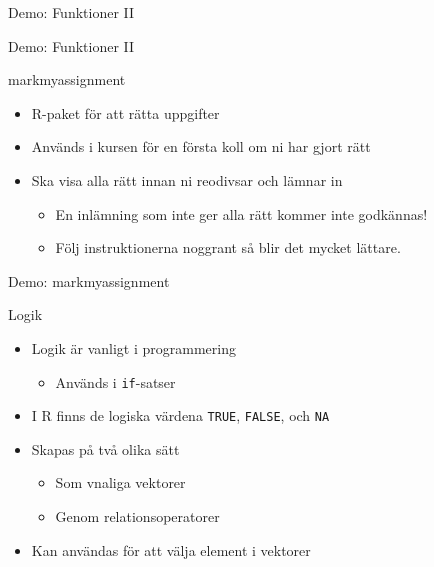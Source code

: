 \documentclass[
  10pt,
  ignorenonframetext,
]{beamer}
\providecommand{\tightlist}{%
  \setlength{\itemsep}{0pt}\setlength{\parskip}{0pt}}
\begin{document}
\begin{frame}{Demo: Funktioner II}
\protect\hypertarget{demo-funktioner-ii}{}
\begin{block}{Demo: Funktioner II}
\protect\hypertarget{demo-funktioner-ii-1}{}
\end{block}
\end{frame}

\begin{frame}{markmyassignment}
\protect\hypertarget{markmyassignment}{}
\begin{itemize}
\tightlist
\item
  R-paket för att rätta uppgifter
\item
  Används i kursen för en första koll om ni har gjort rätt
\item
  Ska visa alla rätt innan ni reodivsar och lämnar in

  \begin{itemize}
  \tightlist
  \item
    En inlämning som inte ger alla rätt kommer inte godkännas!
  \item
    Följ instruktionerna noggrant så blir det mycket lättare.
  \end{itemize}
\end{itemize}

\begin{block}{Demo: markmyassignment}
\protect\hypertarget{demo-markmyassignment}{}
\end{block}
\end{frame}

\begin{frame}{Logik}
\protect\hypertarget{logik}{}
\begin{itemize}
\tightlist
\item
  Logik är vanligt i programmering

  \begin{itemize}
  \tightlist
  \item
    Används i \texttt{if}-satser
  \end{itemize}
\item
  I R finns de logiska värdena \texttt{TRUE}, \texttt{FALSE}, och
  \texttt{NA}
\item
  Skapas på två olika sätt

  \begin{itemize}
  \tightlist
  \item
    Som vnaliga vektorer
  \item
    Genom relationsoperatorer
  \end{itemize}
\item
  Kan användas för att välja element i vektorer
\end{itemize}
\end{frame}
\end{document}
